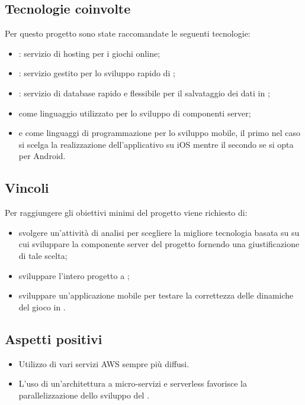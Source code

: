 \subsection{Tecnologie coinvolte}
Per questo progetto sono state raccomandate le seguenti tecnologie:
\begin{itemize}
	\item {}: servizio di hosting per i giochi online;
	\item {}: servizio gestito per lo sviluppo rapido di ;
	\item {}: servizio di database  rapido e flessibile per il salvataggio dei dati in ;
	\item {} come linguaggio utilizzato per lo sviluppo di componenti server;
	\item {} e  come linguaggi di programmazione per lo sviluppo mobile, il primo nel caso si scelga la realizzazione dell'applicativo su iOS mentre il secondo se si opta per Android.
\end{itemize}

\subsection{Vincoli}
Per raggiungere gli obiettivi minimi del progetto viene richiesto di:
\begin{itemize}
	\item svolgere un'attività di analisi per scegliere la migliore tecnologia basata su  su cui sviluppare la componente server del progetto fornendo una giustificazione di tale scelta;
	\item sviluppare l'intero progetto a ;
	\item sviluppare un'applicazione mobile per testare la correttezza delle dinamiche del gioco in .
\end{itemize}

 \subsection{Aspetti positivi}
\begin{itemize}
	\item Utilizzo di vari servizi AWS sempre più diffusi.
	\item L'uso di un'architettura a micro-servizi e serverless favorisce la parallelizzazione dello sviluppo del .
\end{itemize}

